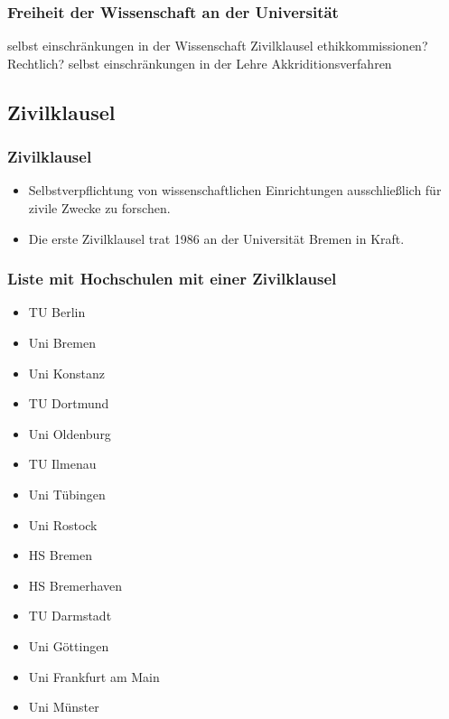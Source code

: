 \begin{frame}
\frametitle{Freiheit der Wissenschaft an der Universität}
selbst einschränkungen in der Wissenschaft
    Zivilklausel
    ethikkommissionen? Rechtlich?
selbst einschränkungen in der Lehre
    Akkriditionsverfahren
\end{frame}

\subsection*{Zivilklausel}
\begin{frame}
\frametitle{Zivilklausel}
\begin{itemize}
\item Selbstverpflichtung von wissenschaftlichen Einrichtungen ausschließlich für zivile Zwecke zu forschen. \cite{ZivKlausel}
\item Die erste Zivilklausel trat 1986 an der Universität Bremen in Kraft.
\end{itemize}

\end{frame}

\begin{frame}
\frametitle{Liste mit Hochschulen mit einer Zivilklausel}
\begin{multicols}{2}
\begin{itemize}
\item TU Berlin
\item Uni Bremen
\item Uni Konstanz
\item TU Dortmund
\item Uni Oldenburg
\item TU Ilmenau
\item Uni Tübingen
\item Uni Rostock
\item HS Bremen
\item HS Bremerhaven
\item TU Darmstadt
\item Uni Göttingen
\item Uni Frankfurt am Main
\item Uni Münster
\end{itemize}
\end{multicols}

\end{frame}

